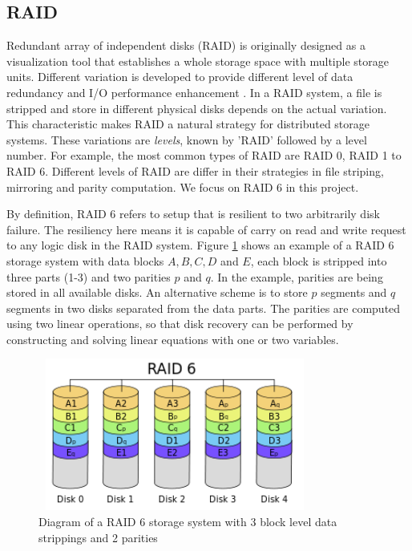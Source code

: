 \subsection{RAID}
Redundant array of independent disks (RAID) is originally designed as a visualization tool that establishes a whole storage space with multiple storage units. Different variation is developed to provide different level of data redundancy and I/O performance enhancement \cite{arpaci2012operating}. In a RAID system, a file is stripped and store in different physical disks depends on the actual variation. This characteristic makes RAID a natural strategy for distributed storage systems. These variations are \textit{levels}, known by 'RAID' followed by a level number. For example, the most common types of RAID are RAID 0, RAID 1 to RAID 6. Different levels of RAID are differ in their strategies in file striping, mirroring and parity computation. We focus on RAID 6 in this project.

By definition, RAID 6 refers to setup that is resilient to two arbitrarily disk failure. The resiliency here means it is capable of carry on read and write request to any logic disk in the RAID system. Figure \ref{fig:raid6} shows an example of a RAID 6 storage system with data blocks $A, B, C, D$ and $E$, each block is stripped into three parts (1-3) and two parities $p$ and $q$. In the example, parities are being stored in all available disks. An alternative scheme is to store $p$ segments and $q$ segments in two disks separated from the data parts. The parities are computed using two linear operations, so that disk recovery can be performed by constructing and solving linear equations with one or two variables. 

\begin{figure}[t]
	\includegraphics[width=9cm,height=5cm,angle=0]{RAID6.png}
	\caption{Diagram of a RAID 6 storage system with 3 block level data strippings and 2 parities \cite{wiki:raid} }
	\label{fig:raid6}
\end{figure}

